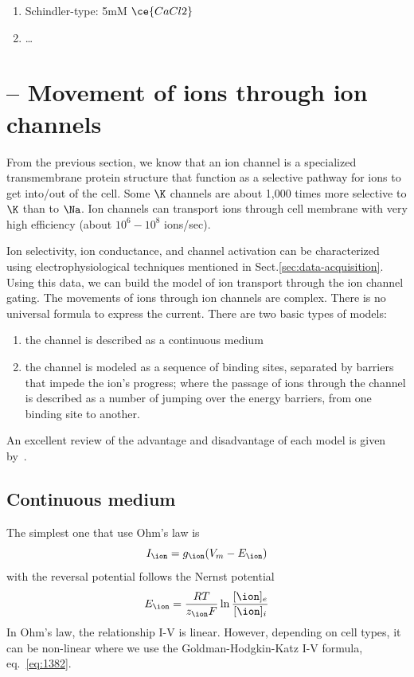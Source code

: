 \begin{enumerate}
\item Schindler-type: 5mM $\ce{CaCl2}$
\item \ldots
\end{enumerate}




\section{-- Movement of ions through ion channels }
\label{sec:movement-ion-across-ion-channels}

From the previous section, we know that an ion channel is a specialized
transmembrane protein structure that function as a selective pathway for ions to
get into/out of the cell. Some $\K$ channels are about 1,000 times more
selective to $\K$ than to $\Na$. Ion channels can transport ions through cell
membrane with very high efficiency (about $10^6-10^8$
ions/sec)\citep{hille1992mb}.

Ion selectivity, ion conductance, and channel activation can be characterized
using electrophysiological techniques mentioned in
Sect.\ref{sec:data-acquisition}. Using this data, we can build the model of ion
transport through the ion channel gating. The movements of ions through ion
channels are complex. There is no universal formula to express the current. There are two basic types of models:
\begin{enumerate}
\item the channel is described as a continuous medium
\item the channel is modeled as a sequence of binding sites, separated
  by barriers that impede the ion's progress; where the passage of
  ions through the channel is described as a number of jumping over
  the energy barriers, from one binding site to another.
\end{enumerate}
An excellent review of the advantage and disadvantage of each model is
given by~\citep{dani1990}.

\subsection{Continuous medium}
\label{sec:continuous-medium}

The simplest one that use Ohm's law is
\begin{equation}
  \label{eq:1405}
  I_\ion = g_\ion (V_m-E_\ion)
\end{equation}
with the reversal potential follows the Nernst potential
\begin{equation}
  \label{eq:1406}
  E_\ion = \frac{RT}{z_\ion F} \ln \frac{[\ion]_e}{[\ion]_i}
\end{equation}
In Ohm's law, the relationship I-V is linear. However, depending on
cell types, it can be non-linear where we use the Goldman-Hodgkin-Katz
I-V formula, eq.~\eqref{eq:1382}.

